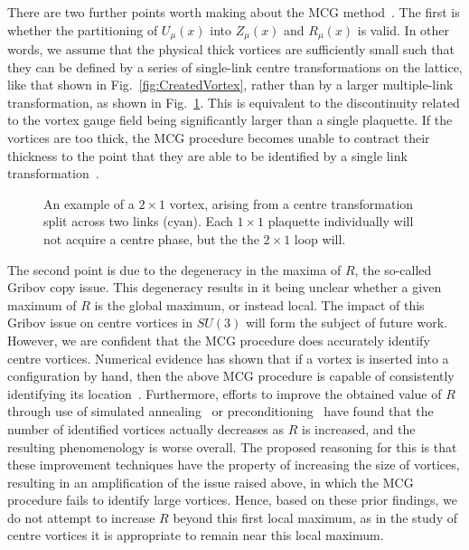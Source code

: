 There are two further points worth making about the MCG method~\cite{Faber:1999gu}. The first is whether the partitioning of $U_\mu(x)$ into $Z_\mu(x)$ and $R_\mu(x)$ is valid. In other words, we assume that the physical thick vortices are sufficiently small such that they can be defined by a series of single-link centre transformations on the lattice, like that shown in Fig.~\ref{fig:CreatedVortex}, rather than by a larger multiple-link transformation, as shown in Fig.~\ref{fig:MultipleLink}. This is equivalent to the discontinuity related to the vortex gauge field being significantly larger than a single plaquette. If the vortices are too thick, the MCG procedure becomes unable to contract their thickness to the point that they are able to be identified by a single link transformation~\cite{Cais:2008za,Kovacs:1999st}.\\
%
\begin{figure}[htb!]
\centering

\caption[An example of a $2\times 1$ vortex, arising from a centre transformation split across two links.]{\label{fig:MultipleLink} An example of a $2\times 1$ vortex, arising from a centre transformation split across two links (cyan). Each $1\times 1$ plaquette individually will not acquire a centre phase, but the the $2\times 1$ loop will.}
\end{figure}
%

The second point is due to the degeneracy in the maxima of $R$, the so-called Gribov copy issue. This degeneracy results in it being unclear whether a given maximum of $R$ is the global maximum, or instead local. The impact of this Gribov issue on centre vortices in $SU(3)$ will form the subject of future work. However, we are confident that the MCG procedure does accurately identify centre vortices. Numerical evidence has shown that if a vortex is inserted into a configuration by hand, then the above MCG procedure is capable of consistently identifying its location~\cite{Faber:1999gu,Montero:1999by}. Furthermore, efforts to improve the obtained value of $R$ through use of simulated annealing~\cite{Bogolubsky:2009dc} or preconditioning~\cite{Cais:2008za} have found that the number of identified vortices actually decreases as $R$ is increased, and the resulting phenomenology is worse overall. The proposed reasoning for this is that these improvement techniques have the property of increasing the size of vortices, resulting in an amplification of the issue raised above, in which the MCG procedure fails to identify large vortices. Hence, based on these prior findings, we do not attempt to increase $R$ beyond this first local maximum, as in the study of centre vortices it is appropriate to remain near this local maximum.\\  

